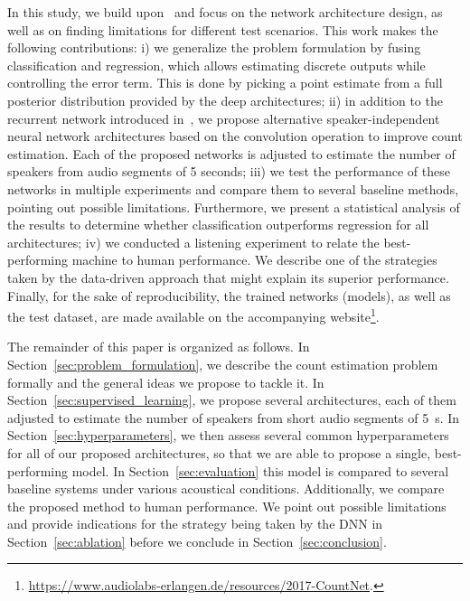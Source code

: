 In this study, we build upon~\cite{stoeter17} and focus on the network architecture design, as well as on finding limitations for different test scenarios.
This work makes the following contributions:
i) we generalize the problem formulation by fusing classification and regression, which allows estimating discrete outputs while controlling the error term. This is done by picking a point estimate from a full posterior distribution provided by the deep architectures;
ii) in addition to the recurrent network introduced in~\cite{stoeter17}, we propose alternative speaker-independent neural network architectures based on the convolution operation to improve count estimation.
Each of the proposed networks is adjusted to estimate the number of speakers from audio segments of 5 seconds;
iii) we test the performance of these networks in multiple experiments and compare them to several baseline methods, pointing out possible limitations.
Furthermore, we present a statistical analysis of the results to determine whether classification outperforms regression for all architectures;
iv) we conducted a listening experiment to relate the best-performing machine to human performance.
We describe one of the strategies taken by the data-driven approach that might explain its superior performance.
Finally, for the sake of reproducibility, the trained networks (models), as well as the test dataset, are made available on the accompanying website\footnote{\url{https://www.audiolabs-erlangen.de/resources/2017-CountNet}.}.
\par
The remainder of this paper is organized as follows. In Section~\ref{sec:problem_formulation}, we describe the count estimation problem formally and the general ideas we propose to tackle it.
In Section~\ref{sec:supervised_learning}, we propose several architectures, each of them adjusted to estimate the number of speakers from short audio segments of 5~s.
In Section~\ref{sec:hyperparameters}, we then assess several common hyperparameters for all of our proposed architectures, so that we are able to propose a single, best-performing model.
In Section~\ref{sec:evaluation} this model is compared to several baseline systems under various acoustical conditions.
Additionally, we compare the proposed method to human performance.
We point out possible limitations and provide indications for the strategy being taken by the DNN in Section~\ref{sec:ablation} before we conclude in Section~\ref{sec:conclusion}.

